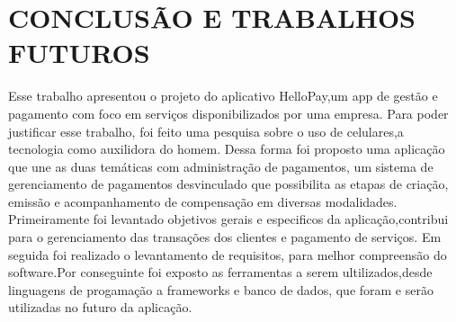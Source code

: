 \documentclass[a4paper,12pt]{article}
\begin{document}
\newpage
\section{CONCLUSÃO E TRABALHOS FUTUROS}
\hspace{0.5cm}Esse trabalho apresentou o projeto do aplicativo HelloPay,um app de gestão e pagamento com
foco em serviços disponibilizados por uma empresa. Para poder justificar esse trabalho,
foi feito uma pesquisa sobre o uso de celulares,a tecnologia como auxilidora do homem.
\newline Dessa forma foi proposto uma aplicação que une as duas temáticas com administração de pagamentos, um sistema de gerenciamento de pagamentos desvinculado que possibilita as etapas de criação, emissão e acompanhamento de compensação em diversas modalidades.
Primeiramente foi levantado objetivos gerais e especificos da aplicação,contribui para o gerenciamento das transações dos clientes e pagamento de serviços.
Em seguida foi realizado o levantamento de requisitos, para melhor compreensão do software.Por conseguinte foi exposto as ferramentas a serem ultilizados,desde linguagens de progamação a
frameworks e banco de dados, que foram e serão utilizadas no futuro da aplicação.
\newpage

\printbibliography
\end{document}

